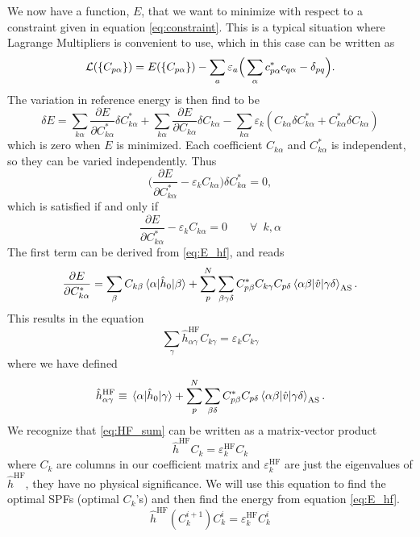 We now have a function, $E$, that we want to minimize with respect to a constraint given in equation \eqref{eq:constraint}. This is a typical situation where Lagrange Multipliers is convenient to use, which in this case can be written as
\begin{equation}
{\cal L}(\{C_{p\alpha}\})=E(\{C_{p\alpha}\})-\sum_a\varepsilon_a\Big(\sum_{\alpha}c_{p\alpha}^*c_{q\alpha}-\delta_{pq}\Big).
\end{equation}
The variation in reference energy is then find to be
\begin{equation}
\delta E=\sum_{k\alpha}\frac{\partial E}{\partial C_{k\alpha}^*}\delta C_{k\alpha}^*+\sum_{k\alpha}\frac{\partial E}{\partial C_{k\alpha}}\delta C_{k\alpha}-\sum_{k\alpha}\varepsilon_k(C_{k\alpha}\delta C_{k\alpha}^*+C_{k\alpha}^*\delta C_{k\alpha})
\label{eq:E_hf}
\end{equation}
which is zero when $E$ is minimized. Each coefficient $C_{k\alpha}$ and $C_{k\alpha}^*$ is independent, so they can be varied independently. Thus
\begin{equation}
\bigg(\frac{\partial E}{\partial C_{k\alpha}^*}-\varepsilon_kC_{k\alpha}\bigg)\delta C_{k\alpha}^*=0,
\end{equation}
which is satisfied if and only if
\begin{equation}
\frac{\partial E}{\partial C_{k\alpha}^*}-\varepsilon_kC_{k\alpha}=0\qquad\forall\,\,\, k,\alpha
\end{equation}
The first term can be derived from \eqref{eq:E_hf}, and reads
\begin{equation}
\frac{\partial E}{\partial C_{k\alpha}^*}=\sum_{\beta}C_{k\beta}\mel{\alpha}{\hat{h}_0}{\beta}+\sum_p^N\sum_{\beta\gamma\delta}C_{p\beta}^*C_{k\gamma}C_{p\delta}\mel{\alpha\beta}{\hat{v}}{\gamma\delta}_{\text{AS}}.
\end{equation}
This results in the equation
\begin{equation}
\sum_{\gamma}\hat{h}_{\alpha\gamma}^{\text{HF}}C_{k\gamma}=\varepsilon_kC_{k\gamma}
\label{eq:HF_sum}
\end{equation}
where we have defined
\begin{equation}
\hat{h}_{\alpha\gamma}^{\text{HF}}\equiv\mel{\alpha}{\hat{h}_0}{\gamma}+\sum_p^N\sum_{\beta\delta}C_{p\beta}^*C_{p\delta}\mel{\alpha\beta}{\hat{v}}{\gamma\delta}_{\text{AS}}.
\end{equation}
We recognize that \eqref{eq:HF_sum} can be written as a matrix-vector product
\begin{equation}
\hat{h}^{\text{HF}}C_k=\varepsilon_k^{\text{HF}}C_k
\end{equation}
where $C_k$ are columns in our coefficient matrix and $\varepsilon_k^{\text{HF}}$ are just the eigenvalues of $\hat{h}^{\text{HF}}$, they have no physical significance. We will use this equation to find the optimal SPFs (optimal $C_k$'s) and then find the energy from equation \eqref{eq:E_hf}.
\begin{equation}
\hat{h}^{\text{HF}}(C_k^{i+1})C_k^i=\varepsilon_k^{\text{HF}}C_k^i
\end{equation}

